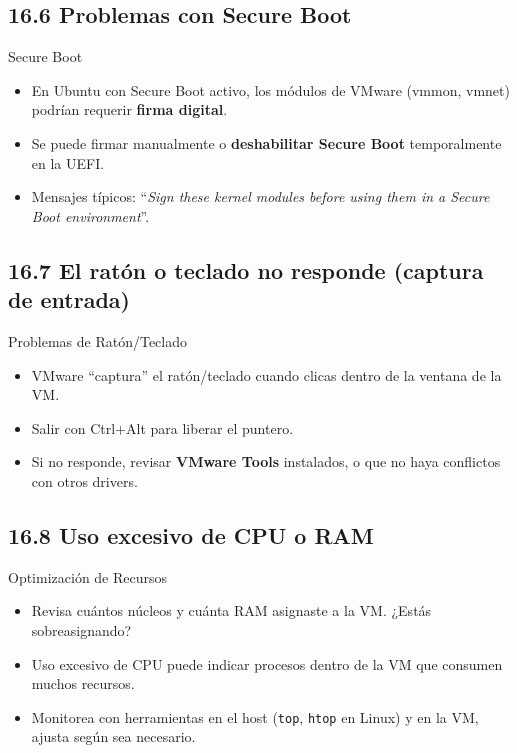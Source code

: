 \documentclass{beamer}
\begin{document}
\subsection{16.6 Problemas con Secure Boot}
\begin{frame}{Secure Boot}
	\begin{itemize}
		\item En Ubuntu con Secure Boot activo, los módulos de VMware (vmmon, vmnet) podrían requerir \textbf{firma digital}.
		\item Se puede firmar manualmente o \textbf{deshabilitar Secure Boot} temporalmente en la UEFI.
		\item Mensajes típicos: “\textit{Sign these kernel modules before using them in a Secure Boot environment}”.
	\end{itemize}
\end{frame}

\subsection{16.7 El ratón o teclado no responde (captura de entrada)}
\begin{frame}{Problemas de Ratón/Teclado}
	\begin{itemize}
		\item VMware “captura” el ratón/teclado cuando clicas dentro de la ventana de la VM.
		\item Salir con Ctrl+Alt para liberar el puntero.
		\item Si no responde, revisar \textbf{VMware Tools} instalados, o que no haya conflictos con otros drivers.
	\end{itemize}
\end{frame}

\subsection{16.8 Uso excesivo de CPU o RAM}
\begin{frame}{Optimización de Recursos}
	\begin{itemize}
		\item Revisa cuántos núcleos y cuánta RAM asignaste a la VM. ¿Estás sobreasignando?
		\item Uso excesivo de CPU puede indicar procesos dentro de la VM que consumen muchos recursos.
		\item Monitorea con herramientas en el host (\texttt{top}, \texttt{htop} en Linux) y en la VM, ajusta según sea necesario.
	\end{itemize}
\end{frame}
\end{document}
